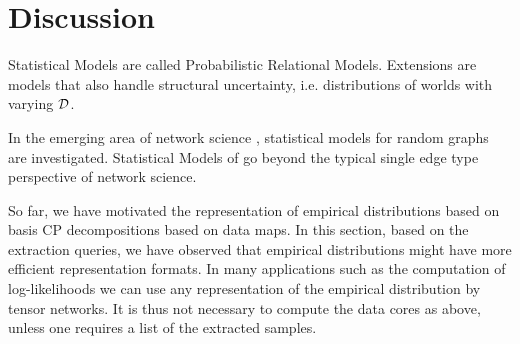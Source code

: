 


\section{Discussion}

Statistical Models are called Probabilistic Relational Models. %
Extensions are models that also handle structural uncertainty, i.e. distributions of worlds with varying $\mathcal{D}$.

In the emerging area of network science \cite{barabasi_network_2016, giovanni_russo_vito_latora_complex_2017}, statistical models for random graphs are investigated.
Statistical Models of \firstOrderLogic{} go beyond the typical single edge type perspective of network science.


%
\begin{remark}
    So far, we have motivated the representation of empirical distributions based on basis CP decompositions based on data maps.
    In this section, based on the extraction queries, we have observed that empirical distributions might have more efficient representation formats.
    In many applications such as the computation of log-likelihoods we can use any representation of the empirical distribution by tensor networks.
    It is thus not necessary to compute the data cores as above, unless one requires a list of the extracted samples.
\end{remark}